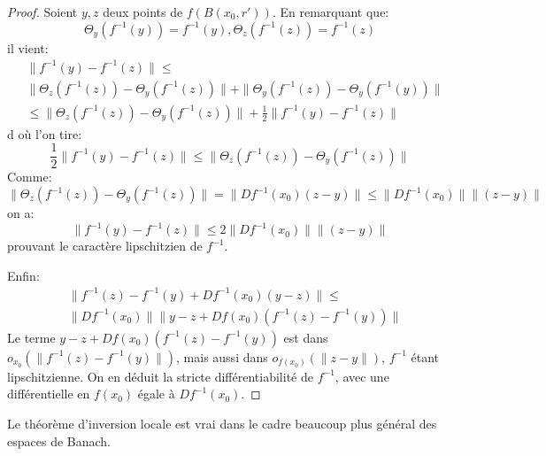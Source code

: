 \begin{proof}
Soient $y,z$ deux points de $f(B(x_0,r\prime))$. En remarquant que:
\[
\Theta_y(f^{-1}(y))=f^{-1}(y), \Theta_z(f^{-1}(z))=f^{-1}(z)
\]
il vient:
\begin{align*}
& \|f^{-1}(y) - f^{-1}(z) \| \leq \\ &
\| \Theta_z(f^{-1}(z)) -\Theta_y(f^{-1}(z)) \| + \| \Theta_y(f^{-1}(z))-\Theta_y(f^{-1}(y)) \| \\
& \leq  \| \Theta_z(f^{-1}(z)) -\Theta_y(f^{-1}(z)) \|  + \frac{1}{2} \|f^{-1}(y) - f^{-1}(z) \|
\end{align*}
d où l'on tire:
\[
 \frac{1}{2} \|f^{-1}(y) - f^{-1}(z) \| \leq  \| \Theta_z(f^{-1}(z)) -\Theta_y(f^{-1}(z)) \| 
\]
Comme:
\[
\| \Theta_z(f^{-1}(z)) -\Theta_y(f^{-1}(z)) \|  = \| Df^{-1}(x_0) (z-y) \| \leq \| Df^{-1}(x_0)\| \|(z-y) \| 
\]
on a:
\[
 \|f^{-1}(y) - f^{-1}(z) \| \leq  2 \| Df^{-1}(x_0)\| \|(z-y) \| 
\]
prouvant le caractère lipschitzien de $f^{-1}$.

Enfin:
\begin{align*}
& \|f^{-1}(z)-f^{-1}(y) +Df^{-1}(x_0)(y-z)\| \leq \\
& \| Df^{-1}(x_0)\| \| y-z+Df(x_0)\left(
f^{-1}(z) - f^{-1}(y)\right) \|
\end{align*}
Le terme $y-z+Df(x_0)\left(f^{-1}(z) - f^{-1}(y)\right)$ est dans $o_{x_0}(\|f^{-1}(z)-f^{-1}(y)\|)$, mais aussi 
dans $o_{f(x_0)}(\|z-y\|)$, $f^{-1}$ étant lipschitzienne. On en déduit la stricte différentiabilité de $f^{-1}$, avec une différentielle en $f(x_0)$ égale à $Df^{-1}(x_0)$.
\end{proof}
\begin{rem}
Le théorème d'inversion locale est vrai dans le cadre beaucoup plus général des espaces de Banach.
\end{rem}

